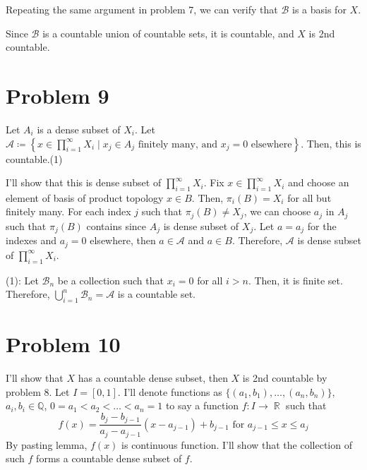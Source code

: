 \documentclass{article}
\DeclareMathOperator{\rr}{\mathbb{R}}
\begin{document}
Repeating the same argument in problem 7, we can verify that $\mathcal{B}$ is a basis for $X$.

Since $\mathcal{B}$ is a countable union of countable sets, it is countable, and $X$ is 2nd countable.
\section*{Problem 9}
Let $A_i$ is a dense subset of $X_i$. Let $\mathcal{A}\coloneqq\left\{x\in \prod_{i=1}^\infty X_i \mid x_j\in A_j \text{ finitely many, and } x_j=0 \text{ elsewhere}\right\}$. Then, this is countable.(1)

I'll show that this is dense subset of $\prod_{i=1}^\infty X_i$. Fix $x\in\prod_{i=1}^\infty X_i$ and choose an element of basis of product topology $x\in B$. Then, $\pi_i(B)=X_i$ for all but finitely many. For each index $j$ such that $\pi_j(B)\neq X_j$, we can choose $a_j$ in $A_j$ such that $\pi_j(B)$ contains since $A_j$ is dense subset of $X_j$. Let $a=a_j$ for the indexes and $a_j=0$ elsewhere, then $a\in \mathcal{A}$ and $a\in B$. Therefore, $\mathcal{A}$ is dense subset of $\prod_{i=1}^\infty X_i$.

(1): Let $\mathcal{B}_n$ be a collection such that $x_i=0$ for all $i>n$. Then, it is finite set. Therefore, $\bigcup_{i=1}^n \mathcal{B}_n=\mathcal{A}$ is a countable set.
\section*{Problem 10}
I'll show that $X$ has a countable dense subset, then $X$ is 2nd countable by problem 8. Let $I=[0, 1]$. I'll denote functions as $\{(a_1, b_1), \ldots, (a_n, b_n)\}$, $a_i, b_i\in \mathbb{Q}$, $0=a_1<a_2<\ldots<a_n=1$ to say a function $f:I\rightarrow\rr$ such that
\begin{equation*}
f(x)=\frac{b_j-b_{j-1}}{a_j-a_{j-1}}(x-a_{j-1})+b_{j-1}\text{ for }a_{j-1}\leq x\leq a_{j}
\end{equation*}
By pasting lemma, $f(x)$ is continuous function. I'll show that the collection of such $f$ forms a countable dense subset of $f$.
\end{document}
